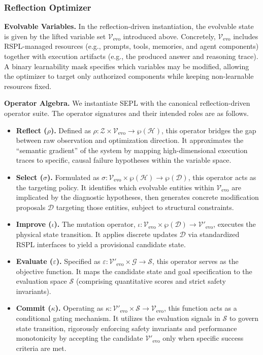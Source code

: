 \subsubsection{Reflection Optimizer}

\textbf{Evolvable Variables.}
In the reflection-driven instantiation, the evolvable state is given by the lifted variable set $\mathcal{V}_{\text{evo}}$ introduced above. Concretely, $\mathcal{V}_{\text{evo}}$ includes RSPL-managed resources (e.g., prompts, tools, memories, and agent components) together with execution artifacts (e.g., the produced answer and reasoning trace). A binary learnability mask specifies which variables may be modified, allowing the optimizer to target only authorized components while keeping non-learnable resources fixed.

\textbf{Operator Algebra.}
We instantiate SEPL with the canonical reflection-driven operator suite. The operator signatures and their intended roles are as follows.

\begin{itemize}[leftmargin=1em, itemsep=0em, parsep=0em, topsep=0em, partopsep=0em]
  \item \textbf{Reflect ($\rho$).} Defined as $\rho: \mathcal{Z} \times \mathcal{V}_{\text{evo}} \rightarrow \wp(\mathcal{H})$, this operator bridges the gap between raw observation and optimization direction. It approximates the ``semantic gradient'' of the system by mapping high-dimensional execution traces to specific, causal failure hypotheses within the variable space.
  \item \textbf{Select ($\sigma$).} Formulated as $\sigma: \mathcal{V}_{\text{evo}} \times \wp(\mathcal{H}) \rightarrow \wp(\mathcal{D})$, this operator acts as the targeting policy. It identifies which evolvable entities within $\mathcal{V}_{\text{evo}}$ are implicated by the diagnostic hypotheses, then generates concrete modification proposals $\mathcal{D}$ targeting those entities, subject to structural constraints.
  \item \textbf{Improve ($\iota$).} The mutation operator, $\iota: \mathcal{V}_{\text{evo}} \times \wp(\mathcal{D}) \rightarrow \mathcal{V}'_{\text{evo}}$, executes the physical state transition. It applies discrete updates $\mathcal{D}$ via standardized RSPL interfaces to yield a provisional candidate state.
  \item \textbf{Evaluate ($\varepsilon$).} Specified as $\varepsilon: \mathcal{V}'_{\text{evo}} \times \mathcal{G} \rightarrow \mathcal{S}$, this operator serves as the objective function. It maps the candidate state and goal specification to the evaluation space $\mathcal{S}$ (comprising quantitative scores and strict safety invariants).
  \item \textbf{Commit ($\kappa$).} Operating as $\kappa: \mathcal{V}'_{\text{evo}} \times \mathcal{S} \rightarrow \mathcal{V}_{\text{evo}}$, this function acts as a conditional gating mechanism. It utilizes the evaluation signals in $\mathcal{S}$ to govern state transition, rigorously enforcing safety invariants and performance monotonicity by accepting the candidate $\mathcal{V}'_{\text{evo}}$ only when specific success criteria are met.
\end{itemize}

